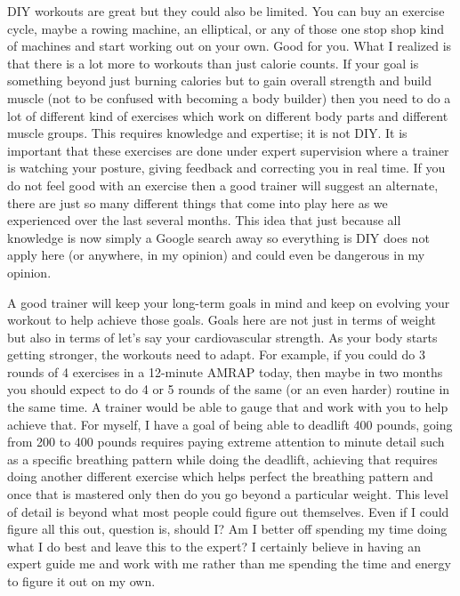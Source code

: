 \documentclass[
  oneside]{book}
\begin{document}
DIY workouts are great but they could also be limited. You can buy an exercise cycle, maybe a rowing machine, an elliptical, or any of those one stop shop kind of machines and start working out on your own. Good for you. What I realized is that there is a lot more to workouts than just calorie counts. If your goal is something beyond just burning calories but to gain overall strength and build muscle (not to be confused with becoming a body builder) then you need to do a lot of different kind of exercises which work on different body parts and different muscle groups. This requires knowledge and expertise; it is not DIY. It is important that these exercises are done under expert supervision where a trainer is watching your posture, giving feedback and correcting you in real time. If you do not feel good with an exercise then a good trainer will suggest an alternate, there are just so many different things that come into play here as we experienced over the last several months. This idea that just because all knowledge is now simply a Google search away so everything is DIY does not apply here (or anywhere, in my opinion) and could even be dangerous in my opinion.

A good trainer will keep your long-term goals in mind and keep on evolving your workout to help achieve those goals. Goals here are not just in terms of weight but also in terms of let's say your cardiovascular strength. As your body starts getting stronger, the workouts need to adapt. For example, if you could do 3 rounds of 4 exercises in a 12-minute AMRAP today, then maybe in two months you should expect to do 4 or 5 rounds of the same (or an even harder) routine in the same time. A trainer would be able to gauge that and work with you to help achieve that. For myself, I have a goal of being able to deadlift 400 pounds, going from 200 to 400 pounds requires paying extreme attention to minute detail such as a specific breathing pattern while doing the deadlift, achieving that requires doing another different exercise which helps perfect the breathing pattern and once that is mastered only then do you go beyond a particular weight. This level of detail is beyond what most people could figure out themselves. Even if I could figure all this out, question is, should I? Am I better off spending my time doing what I do best and leave this to the expert? I certainly believe in having an expert guide me and work with me rather than me spending the time and energy to figure it out on my own.
\end{document}

